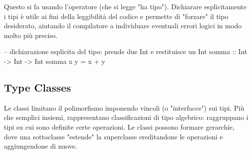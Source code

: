 \documentclass[a4paper,11pt]{report}
\begin{document}
Questo si fa usando l'operatore \code{::} (che si legge "ha tipo"). Dichiarare esplicitamente i tipi è utile ai fini della leggibilità del codice e permette di "forzare" il tipo desiderato, aiutando il compilatore a individuare eventuali errori logici in modo molto più preciso.

\begin{haskellbox}{}
-- dichiarazione esplicita del tipo: prende due Int e restituisce un Int
somma :: Int -> Int -> Int
somma x y = x + y
\end{haskellbox}

\subsection{Type Classes}
Le classi limitano il polimorfismo imponendo vincoli (o "interfacce") sui tipi. Più che semplici insiemi, rappresentano classificazioni di tipo algebrico: raggruppano i tipi su cui sono definite certe operazioni. Le classi possono formare gerarchie, dove una sottoclasse "estende" la superclasse ereditandone le operazioni e aggiungendone di nuove.
\end{document}
